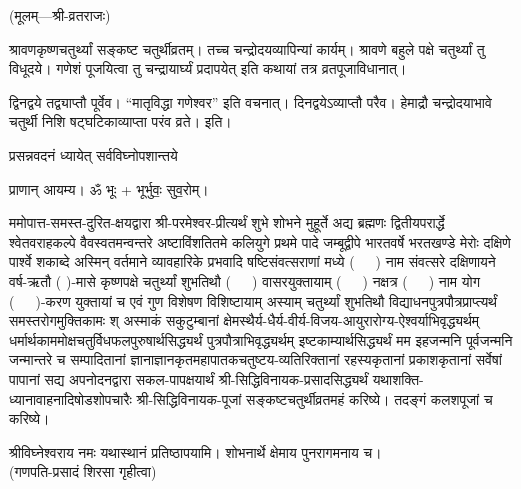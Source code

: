 
\setlength{\parindent}{0pt}
\centerline{\small{(मूलम्—श्री-व्रतराजः)}}

श्रावणकृष्णचतुर्थ्यां सङ्कष्ट चतुर्थीव्रतम्। तच्च चन्द्रोदयव्यापिन्यां कार्यम्। श्रावणे बहुले पक्षे चतुर्थ्यां तु विधूदये। गणेशं पूजयित्वा तु चन्द्रायार्घ्यं प्रदापयेत् इति कथायां तत्र व्रतपूजाविधानात्।

द्विनद्वये तद्व्याप्तौ पूर्वेव। “मातृविद्धा गणेश्वर” इति वचनात्। दिनद्वयेऽव्याप्तौ परैव। हेमाद्रौ चन्द्रोदयाभावे चतुर्थी निशि षट्घटिकाव्याप्ता परंव व्रते।
इति।




{प्रसन्नवदनं ध्यायेत् सर्वविघ्नोपशान्तये}

प्राणान् आयम्य। ॐ भूः + भूर्भुवः॒ सुव॒रोम्।


ममोपात्त-समस्त-दुरित-क्षयद्वारा श्री-परमेश्वर-प्रीत्यर्थं शुभे शोभने मुहूर्ते अद्य ब्रह्मणः
द्वितीयपरार्द्धे श्वेतवराहकल्पे वैवस्वतमन्वन्तरे अष्टाविंशतितमे कलियुगे प्रथमे पादे
जम्बूद्वीपे भारतवर्षे भरतखण्डे मेरोः दक्षिणे पार्श्वे शकाब्दे अस्मिन् वर्तमाने व्यावहारिके
प्रभवादि षष्टिसंवत्सराणां मध्ये \mbox{(~~~)} नाम संवत्सरे दक्षिणायने 
वर्ष-ऋतौ ( )-मासे कृष्णपक्षे चतुर्थ्यां शुभतिथौ \mbox{(~~~)} वासरयुक्तायाम्
\mbox{(~~~)} नक्षत्र \mbox{(~~~)} नाम योग 
\mbox{(~~~)}-करण युक्तायां च एवं गुण विशेषण विशिष्टायाम्
अस्याम् चतुर्थ्यां शुभतिथौ 
विद्याधनपुत्रपौत्रप्राप्त्यर्थं समस्तरोगमुक्तिकामः श्
अस्माकं सकुटुम्बानां क्षेमस्थैर्य-धैर्य-वीर्य-विजय-आयुरारोग्य-ऐश्वर्याभिवृद्ध्यर्थम्
धर्मार्थकाममोक्ष\-चतुर्विधफलपुरुषार्थसिद्ध्यर्थं पुत्रपौत्राभि\-वृद्ध्यर्थम् इष्टकाम्यार्थसिद्ध्यर्थं
मम इहजन्मनि पूर्वजन्मनि जन्मान्तरे च सम्पादितानां ज्ञानाज्ञानकृतमहा\-पातकचतुष्टय-व्यतिरिक्तानां 
रहस्यकृतानां प्रकाशकृतानां सर्वेषां पापानां सद्य अपनोदनद्वारा 
सकल-पापक्षयार्थं श्री-सिद्धिविनायक-प्रसादसिद्ध्यर्थं 
यथाशक्ति-ध्यानावाहनादिषोडशोपचारैः श्री-सिद्धिविनायक-पूजां सङ्कष्टचतुर्थीव्रतमहं करिष्ये। तदङ्गं कलशपूजां च करिष्ये। 

श्रीविघ्नेश्वराय नमः यथास्थानं प्रतिष्ठापयामि। शोभनार्थे क्षेमाय पुनरागमनाय च।\\
(गणपति-प्रसादं शिरसा गृहीत्वा)


